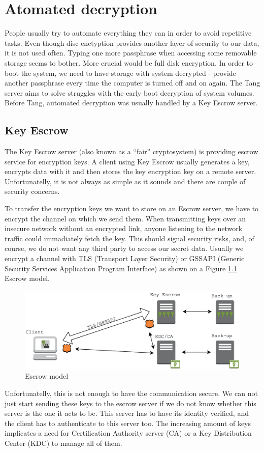 \chapter{Atomated decryption}

People usually try to automate everything they can in order to avoid repetitive tasks. %
Even though disc enctyption provides another layer of security to our data, it is not used often.
Typing one more passphrase when accessing some removable storage seems to bother.
More crucial would be full disk encryption.
In order to boot the system, we need to have storage with system decrypted - provide another passphrase every time the computer is turned off and on again.
The Tang server aims to solve struggles with the early boot decryption of system volumes.
Before Tang, automated decryption was usually handled by a Key Escrow server.

\section{Key Escrow}\label{escrow}

The Key Escrow server (also known as a “fair” cryptosystem) is providing escrow service for encryption keys.
A client using Key Escrow usually generates a key, encrypts data with it and then stores the key encryption key on a remote server.
Unfortunatelly, it is not always as simple as it sounds and there are couple of security concerns.

To transfer the encryption keys we want to store on an Escrow server, we have to encrypt the channel on which we send them.
When transmitting keys over an insecure network without an encrypted link, anyone listening to the network traffic could immadiately fetch the key.
This should signal security risks, and, of course, we do not want any third party to access our secret data.
Usually we encrypt a channel with TLS (Transport Layer Security) or GSSAPI (Generic Security Services Application Program Interface) as shown on a Figure \ref{fig_escrowmodel} Escrow model.
\begin{figure}[h]
    \centering
    \includegraphics[scale=0.7]{figures/EscrowModel.pdf}
    \caption{Escrow model}
    \label{fig_escrowmodel}
\end{figure}
Unfortunatelly, this is not enough to have the communication secure.
We can not just start sending these keys to the escrow server if we do not know whether this server is the one it acts to be.
This server has to have its identity verified, and the client has to authenticate to this server too.
The increasing amount of keys implicates a need for Certification Authority server (CA) or a Key Distribution Center (KDC) to manage all of them.

